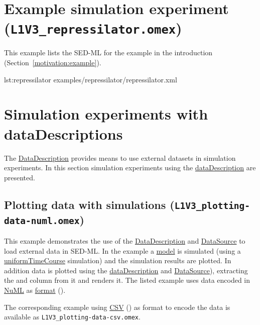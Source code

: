 \section{Example simulation experiment (\texttt{L1V3\_repressilator.omex})}
\label{example:repressilator}
This example lists the SED-ML for the example in the introduction (Section~\ref{motivation:example}).

{lst:repressilator}
{examples/repressilator/repressilator.xml}

\pagebreak
\section{Simulation experiments with dataDescriptions}
The \hyperref[class:dataDescription]{DataDescription} provides means to use external datasets in simulation experiments. In this section simulation experiments using the \hyperref[class:dataDescription]{dataDescription} are presented.

\subsection{Plotting data with simulations (\texttt{L1V3\_plotting-data-numl.omex})}
This example demonstrates the use of the \hyperref[class:dataDescription]{DataDescription} and \hyperref[class:dataSource]{DataSource} to load external data in SED-ML. In the example a \hyperref[class:model]{model} is simulated (using a \hyperref[class:uniformTimeCourse]{uniformTimeCourse} simulation) and the simulation results are plotted. In addition data is plotted using the \hyperref[class:dataDescription]{dataDescription} and \hyperref[class:dataSource]{DataSource}), extracting the  and  column from it and renders it. The listed example uses data encoded in \hyperref[sec:dataFormatNUML]{NuML} as \hyperref[sec:dataFormatURI]{format} (). 

The corresponding example using \hyperref[sec:dataFormatCSV]{CSV} () as format to encode the data is available as \texttt{L1V3\_plotting-data-csv.omex}.

